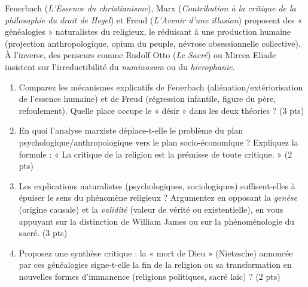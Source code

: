 \documentclass[11pt]{article}
\begin{document}
\begin{exercice}
Feuerbach (\textit{L'Essence du christianisme}), Marx (\textit{Contribution à la critique de la philosophie du droit de Hegel}) et Freud (\textit{L'Avenir d'une illusion}) proposent des « généalogies » naturalistes du religieux, le réduisant à une production humaine (projection anthropologique, opium du peuple, névrose obsessionnelle collective). À l'inverse, des penseurs comme Rudolf Otto (\textit{Le Sacré}) ou Mircea Eliade insistent sur l'irreductibilité du \textit{numinosum} ou du \textit{hierophanie}.
\begin{enumerate}
    \item Comparez les mécanismes explicatifs de Feuerbach (aliénation/extériorisation de l'essence humaine) et de Freud (régression infantile, figure du père, refoulement). Quelle place occupe le « désir » dans les deux théories ? (3 pts)
    \item En quoi l'analyse marxiste déplace-t-elle le problème du plan psychologique/anthropologique vers le plan socio-économique ? Expliquez la formule : « La critique de la religion est la prémisse de toute critique. » (2 pts)
    \item Les explications naturalistes (psychologiques, sociologiques) suffisent-elles à épuiser le sens du phénomène religieux ? Argumentez en opposant la \textit{genèse} (origine causale) et la \textit{validité} (valeur de vérité ou existentielle), en vous appuyant sur la distinction de William James ou sur la phénoménologie du sacré. (3 pts)
    \item Proposez une synthèse critique : la « mort de Dieu » (Nietzsche) annoncée par ces généalogies signe-t-elle la fin de la religion ou sa transformation en nouvelles formes d'immanence (religions politiques, sacré laïc) ? (2 pts)
\end{enumerate}
\end{exercice}
\end{document}

